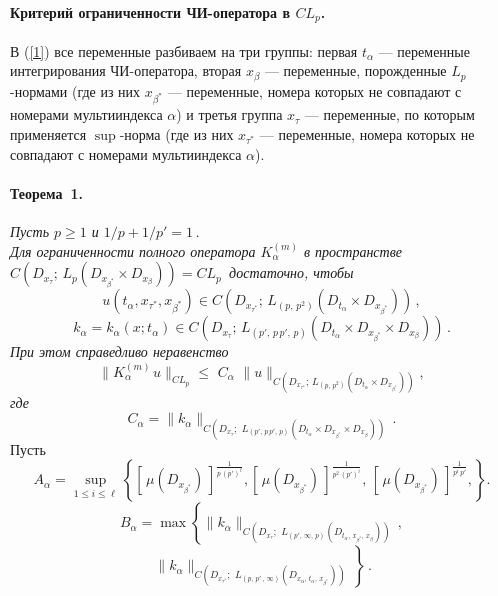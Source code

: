 \paragraph{Критерий ограниченности ЧИ-оператора в $CL_p$.}
В (\ref{1}) все переменные разбиваем на три группы: первая $t_\alpha$ --- переменные интегрирования ЧИ-оператора, вторая  $x_\beta$ --- переменные, порожденные $L_p$-нормами (где из них $x_{\beta^*}$ --- переменные, номера которых не совпадают с номерами мультииндекса $\alpha$) и третья группа $x_{\tau}$ --- переменные, по которым применяется $\sup$-норма (где из них $x_{\tau^*}$ --- переменные, номера которых не совпадают с номерами мультииндекса $\alpha$).

\paragraph{Теорема~1.}
 {\it Пусть $p \geq1$ и $1/p+1/p'=1$\,. \\
 Для ограниченности полного оператора $K_\alpha^{(m)}$  в пространстве
$C(D_{x_\tau};\,L_{{p}}( D_{x_{\beta^*}} {\times}  D_{x_{\beta}}))=CL_{p}\,$
достаточно, чтобы
$$
u(t_\alpha,x_{\tau^*},x_{\beta^*})\in
C(D_{x_{\tau^{*}}};\,L_{(p,\, p^2)}(D_{t_\alpha}{\times} D_{x_{\beta^*}} ))\,,
$$
$$
k_\alpha=k_\alpha(x;t_\alpha)\in C(D_{x_\tau};\,L_{(p',\,p\, p',\,p)}(D_{t_\alpha}{\times} D_{x_{\beta^*}}{\times} D_{x_{\beta}} ))\,.
$$
При этом справедливо неравенство
$$
\|K_{\alpha}^{(m)\,} u\|_{CL_{p}}
{\leq}\,\, C_{\alpha} \,\,\|u\|_{C(D_{x_{\tau^*}};\,L_{(p,\,p^2)}(D_{t_\alpha}\times D_{x_{\beta^*}}))},
$$
где
$$
  C_{\alpha}= \|k_{\alpha}\|_{C(D_{x_\tau};\,\, L_{(p',\,p\, p',\, p)}(D_{t_\alpha}\times D_{x_{\beta^*}}\times D_{x_\beta}))}\,.
$$}
 Пусть
$$
A_\alpha=\sup\limits_{1\leq i\leq {\ell}}\left\{[\,\mu(D_{x_{\beta^*}})\,]^{\frac{1}{p \, (p')^\ell}}, [\,\mu(D_{x_{\beta^*}})\,]^{\frac{1}{p^2\,(p')^i}},\, [\,\mu(D_{x_{\beta^*}})\,]^{\frac{1}{p^i \, p'}},\right\}.
$$
$$
B_\alpha= \max \left\{\|k_\alpha\|_{C(D_{x_\tau};\,\, L_{(p',\, \infty,\, p)}(D_{t_\alpha,\, x_{\beta^*},\,x_{\beta}}))}\,,\right.
$$
$$
\,\left.\|k_\alpha\|_{ C(D_{x_{\tau^*}};\,\, L_{(p,\, p'\,,\, \infty)}(D_{x_\alpha,\, t_{\alpha},\,x_{\beta^*}}))}\, \right\}\,.
$$
